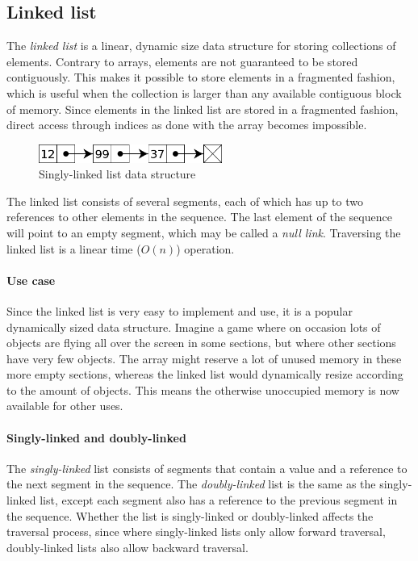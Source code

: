\documentclass{article}
\begin{document}


\subsection{Linked list}
The {\em linked list} is a linear, dynamic size data structure for storing collections of elements. Contrary to arrays,
elements are not guaranteed to be stored contiguously. This makes it possible to store elements in a fragmented fashion,
which is useful when the collection is larger than any available contiguous block of memory. Since elements in the linked
list are stored in a fragmented fashion, direct access through indices as done with the array becomes impossible.

\begin{figure}[H]
  \centering
  \includegraphics[width=6cm]{linked_list}
  \caption{Singly-linked list data structure}
\end{figure}

The linked list consists of several segments, each of which has up to two references to other
elements in the sequence. The last element of the sequence will point to an empty segment,
which may be called a {\em null link}. Traversing the linked list is a linear time (\(O(n)\)) operation.

\paragraph{Use case}
Since the linked list is very easy to implement and use, it is a popular dynamically sized data structure. Imagine a game
where on occasion lots of objects are flying all over the screen in some sections, but where other sections have very few
objects. The array might reserve a lot of unused memory in these more empty sections, whereas the linked list would dynamically
resize according to the amount of objects. This means the otherwise unoccupied memory is now available for other uses.

\paragraph{Singly-linked and doubly-linked}
The {\em singly-linked} list consists of segments that contain a value and a reference to the next
segment in the sequence. The {\em doubly-linked} list is the same as the singly-linked list,
except each segment also has a reference to the previous segment in the sequence.
Whether the list is singly-linked or doubly-linked affects the traversal process,
since where singly-linked lists only allow forward traversal, doubly-linked lists also allow backward traversal.
\end{document}
